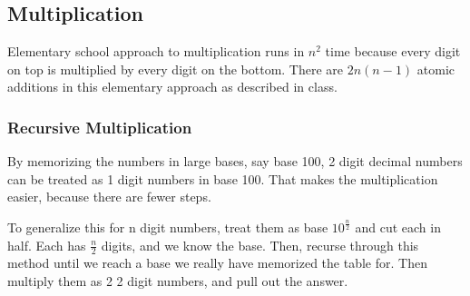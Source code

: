 \documentclass[english, 10pt]{article}
\begin{document}
\subsection{Multiplication}

Elementary school approach to multiplication runs in $n^2$ time because every digit on top is multiplied by every digit on the bottom. There are $2n(n-1)$ atomic additions in this elementary approach as described in class.\\
\begin{center}
\end{center}

\subsubsection{Recursive Multiplication}

By memorizing the numbers in large bases, say base 100, 2 digit decimal numbers can be treated as 1 digit numbers in base 100.
That makes the multiplication easier, because there are fewer steps.

To generalize this for n digit numbers, treat them as base $10^{\frac{n}{2}}$ and cut each in half. Each has $\frac{n}{2}$ digits, and we know the base.
Then, recurse through this method until we reach a base we really have memorized the table for. Then multiply them as 2 2 digit numbers, and pull out the answer.


\end{document}
